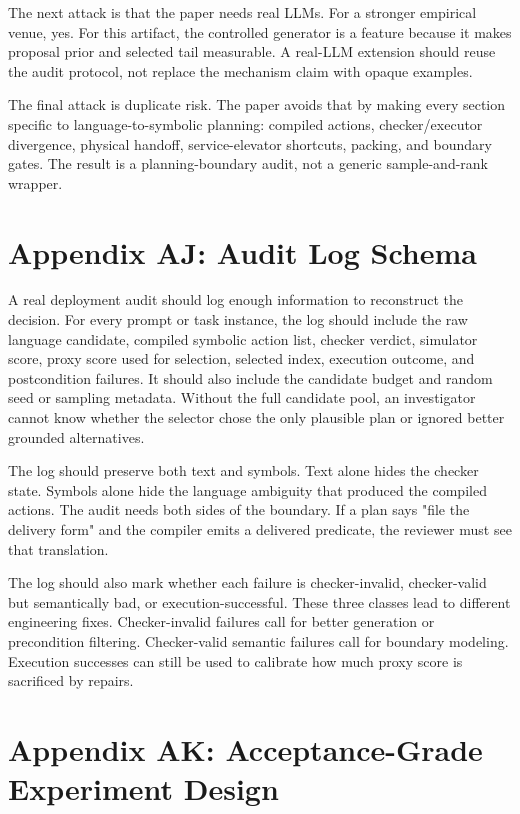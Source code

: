 \documentclass{article}
\begin{document}
The next attack is that the paper needs real LLMs. For a stronger empirical
venue, yes. For this artifact, the controlled generator is a feature because
it makes proposal prior and selected tail measurable. A real-LLM extension
should reuse the audit protocol, not replace the mechanism claim with opaque
examples.

The final attack is duplicate risk. The paper avoids that by making every
section specific to language-to-symbolic planning: compiled actions,
checker/executor divergence, physical handoff, service-elevator shortcuts,
packing, and boundary gates. The result is a planning-boundary audit, not a
generic sample-and-rank wrapper.

\section*{Appendix AJ: Audit Log Schema}

A real deployment audit should log enough information to reconstruct the
decision. For every prompt or task instance, the log should include the raw
language candidate, compiled symbolic action list, checker verdict, simulator
score, proxy score used for selection, selected index, execution outcome, and
postcondition failures. It should also include the candidate budget and random
seed or sampling metadata. Without the full candidate pool, an investigator
cannot know whether the selector chose the only plausible plan or ignored
better grounded alternatives.

The log should preserve both text and symbols. Text alone hides the checker
state. Symbols alone hide the language ambiguity that produced the compiled
actions. The audit needs both sides of the boundary. If a plan says "file the
delivery form" and the compiler emits a delivered predicate, the reviewer must
see that translation.

The log should also mark whether each failure is checker-invalid, checker-valid
but semantically bad, or execution-successful. These three classes lead to
different engineering fixes. Checker-invalid failures call for better
generation or precondition filtering. Checker-valid semantic failures call for
boundary modeling. Execution successes can still be used to calibrate how much
proxy score is sacrificed by repairs.

\section*{Appendix AK: Acceptance-Grade Experiment Design}
\end{document}
